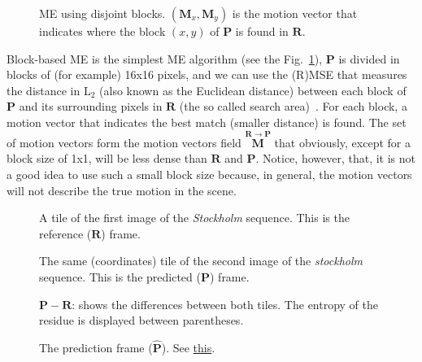 \begin{figure}
  \centering
  \caption{ME using disjoint blocks. $({\mathbf M}_x, {\mathbf M}_y)$
    is the motion vector that indicates where the block $(x,y)$ of
    ${\mathbf P}$ is found in ${\mathbf R}$.}
  \label{fig:simple}
\end{figure}

Block-based ME is the simplest ME algorithm (see the
Fig.~\ref{fig:simple}), ${\mathbf P}$ is divided in blocks of (for
example) 16x16 pixels, and we can use the (R)MSE that measures the
distance in L$_2$ (also known as the Euclidean distance) between each
block of ${\mathbf P}$ and its surrounding pixels in ${\mathbf R}$
(the so called search area)~\cite{zhu2000new}. For each block, a
motion vector that indicates the best match (smaller distance) is
found. The set of motion vectors form the motion vectors field
$\overset{{\mathbf R}\rightarrow {\mathbf P}}{\mathbf M}$ that
obviously, except for a block size of 1x1, will be less dense than
${\mathbf R}$ and ${\mathbf P}$. Notice, however, that, it is not a
good idea to use such a small block size because, in general, the
motion vectors will not describe the true motion in the scene.

\begin{figure}
  \centering
  \caption{A tile of the first image of the \emph{Stockholm}
    sequence. This is the reference (${\mathbf R}$) frame.}
  \label{fig:R_block}
\end{figure}

\begin{figure}
  \centering
  \caption{The same (coordinates) tile of the second image of the
    \emph{stockholm} sequence. This is the predicted (${\mathbf P}$)
    frame.}
  \label{fig:P_block}
\end{figure}

\begin{figure}
  \centering
  \caption{${\mathbf P} - {\mathbf R}$: shows the differences between
    both tiles. The entropy of the residue is displayed between
    parentheses.}
  \label{fig:RP_block}
\end{figure}

\begin{figure}
  \centering
  \caption{The prediction frame (${\hat{\mathbf P}}$). See \href{https://github.com/Sistemas-Multimedia/Sistemas-Multimedia.github.io/blob/master/milestones/09-ME/full_search_block_ME.ipynb}{this}.}
  \label{fig:hat_P_block}
\end{figure}


